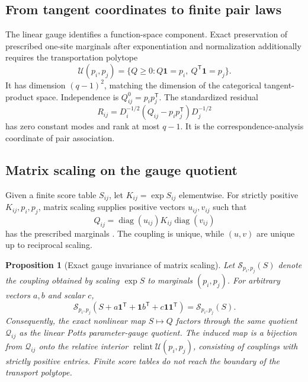 \documentclass[10pt]{article}
\newcommand{\diag}{\operatorname{diag}}
\newtheorem{proposition}[theorem]{Proposition}
\theoremstyle{definition}
\theoremstyle{remark}
\newcommand{\BookSection}[1]{\subsection{#1}}
\begin{document}
\BookSection{From tangent coordinates to finite pair laws}

The linear gauge identifies a function-space component.  Exact preservation of prescribed
one-site marginals after exponentiation and normalization additionally requires the transportation
polytope
\begin{equation}
\mathcal U(p_i,p_j)
=\{Q\geq0:Q\mathbf1=p_i,\ Q^{\mathsf T}\mathbf1=p_j\}.
\label{eq:transport-polytope}
\end{equation}
It has dimension $(q-1)^2$, matching the dimension of the categorical tangent-product space.
Independence is $Q_{ij}^0=p_ip_j^{\mathsf T}$.  The standardized residual
\begin{equation}
R_{ij}
=D_i^{-1/2}(Q_{ij}-p_ip_j^{\mathsf T})D_j^{-1/2}
\label{eq:standardized-residual}
\end{equation}
has zero constant modes and rank at most $q-1$.  It is the correspondence-analysis coordinate of
pair association.

\BookSection{Matrix scaling on the gauge quotient}

Given a finite score table $S_{ij}$, let $K_{ij}=\exp S_{ij}$ elementwise.  For strictly positive
$K_{ij},p_i,p_j$, matrix scaling supplies positive vectors $u_{ij},v_{ij}$ such that
\begin{equation}
Q_{ij}=\diag(u_{ij})K_{ij}\diag(v_{ij})
\label{eq:sinkhorn-coupling}
\end{equation}
has the prescribed marginals \cite{sinkhorn1964,darroch1972,csiszar1975,cuturi2013}.  The coupling
is unique, while $(u,v)$ are unique up to reciprocal scaling.

\begin{proposition}[Exact gauge invariance of matrix scaling]
\label{prop:sinkhorn-gauge}
Let $\mathscr S_{p_i,p_j}(S)$ denote the coupling obtained by scaling $\exp S$ to marginals
$(p_i,p_j)$.  For arbitrary vectors $a,b$ and scalar $c$,
\begin{equation}
\mathscr S_{p_i,p_j}
\left(S+a\mathbf1^{\mathsf T}+\mathbf1b^{\mathsf T}+c\mathbf1\mathbf1^{\mathsf T}\right)
=\mathscr S_{p_i,p_j}(S).
\label{eq:sinkhorn-gauge}
\end{equation}
Consequently, the exact nonlinear map $S\mapsto Q$ factors through the same quotient
$\mathcal Q_{ij}$ as the linear Potts parameter-gauge quotient.  The induced map is a bijection
from $\mathcal Q_{ij}$ onto the relative interior
$\operatorname{relint}\mathcal U(p_i,p_j)$, consisting of couplings with strictly positive entries.
Finite score tables do not reach the boundary of the transport polytope.
\end{proposition}
\end{document}
